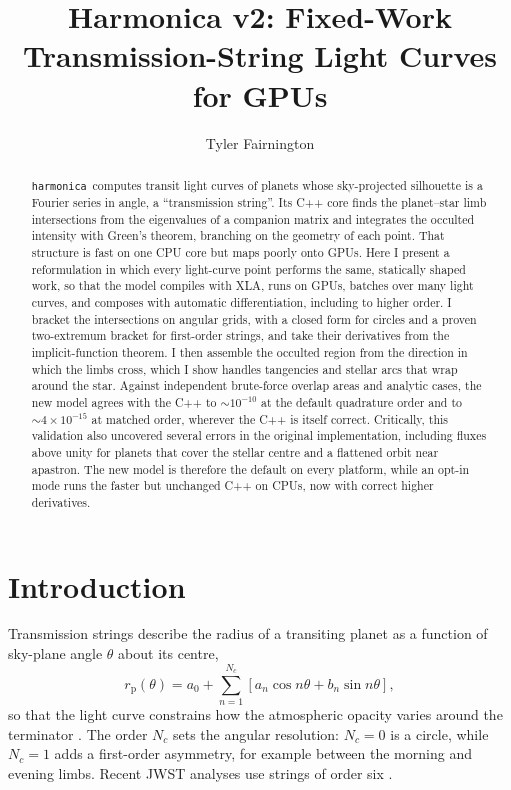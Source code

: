 \documentclass[twocolumn]{aastex701}
\newcommand{\harmonica}{\texttt{harmonica}}
\begin{document}
\title{Harmonica v2: Fixed-Work Transmission-String Light Curves for GPUs}

\author{Tyler Fairnington}

\begin{abstract}
\harmonica\ computes transit light curves of planets whose sky-projected
silhouette is a Fourier series in angle, a ``transmission string''. Its
C++ core finds the planet--star limb intersections from the eigenvalues
of a companion matrix and integrates the occulted intensity with Green's
theorem, branching on the geometry of each point. That structure is fast
on one CPU core but maps poorly onto GPUs. Here I present a reformulation
in which every light-curve point performs the same, statically shaped
work, so that the model compiles with XLA, runs on GPUs, batches over many
light curves, and composes with automatic differentiation, including to
higher order. I bracket the intersections on angular grids, with a closed
form for circles and a proven two-extremum bracket for first-order
strings, and take their derivatives from the implicit-function theorem. I
then assemble the occulted region from the direction in which the limbs
cross, which I show handles tangencies and stellar arcs that wrap around
the star. Against independent brute-force overlap areas and analytic
cases, the new model agrees with the C++ to ${\sim}10^{-10}$ at the
default quadrature order and to ${\sim}4\times10^{-15}$ at matched order,
wherever the C++ is itself correct. Critically, this validation also
uncovered several errors in the original implementation, including fluxes
above unity for planets that cover the stellar centre and a flattened
orbit near apastron. The new model is therefore the default on every
platform, while an opt-in mode runs the faster but unchanged C++ on CPUs,
now with correct higher derivatives.
\end{abstract}


\section{Introduction} \label{sec:intro}

Transmission strings describe the radius of a transiting planet as a
function of sky-plane angle $\theta$ about its centre,
\begin{equation}
r_\mathrm{p}(\theta) = a_0 + \sum_{n=1}^{N_c} \left[a_n \cos n\theta +
b_n \sin n\theta\right],
\label{eq:string}
\end{equation}
so that the light curve constrains how the atmospheric opacity varies
around the terminator \citep{grant2023}. The order $N_c$ sets the angular
resolution: $N_c=0$ is a circle, while $N_c=1$ adds a first-order
asymmetry, for example between the morning and evening limbs. Recent
JWST analyses use strings of order six \citep{alderson2026}.
\end{document}
